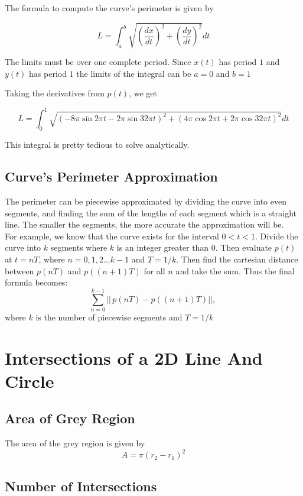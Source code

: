 \documentclass[a4paper,10pt]{scrartcl}
\begin{document}
The formula to compute the curve's perimeter is given by

\[ L = \int_{a}^{b} \sqrt{\left( \frac{dx}{dt}\right)^2 + \left( \frac{dy}{dt}\right)^2}dt\]

The limits must be over one complete period. Since $x(t)$ has period $1$ and $y(t)$ has period $1$ the limits of the integral can be $a=0$ and $b=1$

Taking the derivatives from $p(t)$, we get

\[ L = \int_{0}^{1} \sqrt{\left( -8\pi\sin{2\pi t} - 2\pi\sin{32\pi t} \right)^2 + \left( 4\pi\cos{2\pi t} + 2\pi\cos{32\pi t}\right)^2}dt\]

This integral is pretty tedious to solve analytically.

\subsection{Curve's Perimeter Approximation}

The perimeter can be piecewise approximated by dividing the curve into even segments,
and finding the sum of the lengths of each segment which is a straight line. The smaller the segments,
the more accurate the approximation will be.\\

For example, we know that the curve exists for the interval $0 < t < 1$. Divide the curve into $k$ segments where $k$ is an integer greater than 0.
Then evaluate $p(t)$ at $t = nT$, where $n = 0,1,2 \ldots k-1$ and $T = 1/k$. Then find the cartesian distance between
$p(nT)$ and $p((n+1)T)$ for all $n$ and take the sum. Thus the final formula becomes:\\
\[
\sum_{n=0}^{k-1}
  ||\,p(nT) - p((n+1)T)||,\,\] where $k$ is the number of piecewise segments and $T = 1/k$

\section{Intersections of a 2D Line And Circle}

\subsection{Area of Grey Region}

The area of the grey region is given by \[ A = \pi(r_2-r_1)^2\]

\subsection{Number of Intersections}
\end{document}
